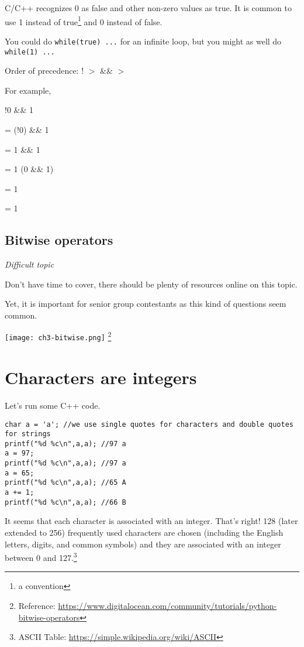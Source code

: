 C/C++ recognizes 0 as false and other non-zero values as true. It is common to use 1 instead of true\footnote{a convention} and 0 instead of false.

You could do \texttt{while(true) ...} for an infinite loop, but you might as well do \texttt{while(1) ...}


Order of precedence: ! $>$ \&\& $>$ \textbar\textbar

For example, 

!0 \textbar{} \&\& 1

= (!0) \textbar{} \&\& 1

= 1 \textbar{} \&\& 1

= 1 \textbar\textbar (0 \&\& 1)

= 1 \textbar{}

= 1

\subsection{Bitwise operators}

\textit{Difficult topic}


Don't have time to cover, there should be plenty of resources online on this topic. 

Yet, it is important for senior group contestants as this kind of questions seem common. 

\texttt{[image: ch3-bitwise.png]}
\footnote{Reference: \href{https://www.digitalocean.com/community/tutorials/python-bitwise-operators}{https://www.digitalocean.com/community/tutorials/python-bitwise-operators}}

\section{Characters are integers}

Let's run some C++ code.

\begin{lstlisting}
char a = 'a'; //we use single quotes for characters and double quotes for strings
printf("%d %c\n",a,a); //97 a
a = 97;
printf("%d %c\n",a,a); //97 a
a = 65;
printf("%d %c\n",a,a); //65 A
a += 1;
printf("%d %c\n",a,a); //66 B
\end{lstlisting}

It seems that each character is associated with an integer. That's right! 128 (later extended to 256) frequently used characters are chosen (including the English letters, digits, and common symbols) and they are associated with an integer between 0 and 127.\footnote{ASCII Table: \href{https://simple.wikipedia.org/wiki/ASCII}{https://simple.wikipedia.org/wiki/ASCII}}

